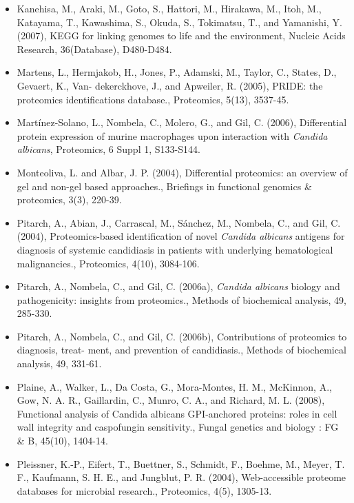 \begin{itemize}[leftmargin=*]
\item[]{
Kanehisa, M., Araki, M., Goto, S., Hattori, M., Hirakawa, M., Itoh, M., Katayama, T., 
Kawashima, S., Okuda, S., Tokimatsu, T., and Yamanishi, Y. (2007), KEGG for linking genomes to
life and the environment, Nucleic Acids Research, 36(Database), D480-D484.
}

\item[]{
Martens, L., Hermjakob, H., Jones, P., Adamski, M., Taylor, C., States, D., Gevaert, K., Van-
dekerckhove, J., and Apweiler, R. (2005), PRIDE: the proteomics identifications database.,
Proteomics, 5(13), 3537-45.
}

\item[]{
Mart\'inez-Solano, L., Nombela, C., Molero, G., and Gil, C. (2006), Differential 
protein expression of murine macrophages upon interaction with \textit{Candida albicans}, Proteomics, 6 Suppl
1, S133-S144.
}

\item[]{
Monteoliva, L. and Albar, J. P. (2004), Differential proteomics: an overview of gel and non-gel
based approaches., Briefings in functional genomics \& proteomics, 3(3), 220-39.
}

\item[]{
Pitarch, A., Abian, J., Carrascal, M., S\'anchez, M., Nombela, C., and Gil, C. (2004),
Proteomics-based identification of novel \textit{Candida albicans} antigens for diagnosis 
of systemic candidiasis in patients with underlying hematological malignancies.,
Proteomics, 4(10), 3084-106.
}

\item[]{
Pitarch, A., Nombela, C., and Gil, C. (2006a), \textit{Candida albicans} biology and pathogenicity:
insights from proteomics., Methods of biochemical analysis, 49, 285-330.
}

\item[]{
Pitarch, A., Nombela, C., and Gil, C. (2006b), Contributions of proteomics to diagnosis, treat-
ment, and prevention of candidiasis., Methods of biochemical analysis, 49, 331-61.
}

\item[]{
Plaine, A., Walker, L., Da Costa, G., Mora-Montes, H. M., McKinnon, A., Gow, N. A. R., 
Gaillardin, C., Munro, C. A., and Richard, M. L. (2008), Functional analysis of Candida albicans
GPI-anchored proteins: roles in cell wall integrity and caspofungin sensitivity., 
Fungal genetics and biology : FG \& B, 45(10), 1404-14.
}

\item[]{
Pleissner, K.-P., Eifert, T., Buettner, S., Schmidt, F., Boehme, M., Meyer, T. F., Kaufmann, S.
H. E., and Jungblut, P. R. (2004), Web-accessible proteome databases for microbial 
research., Proteomics, 4(5), 1305-13.
}


\end{itemize}
